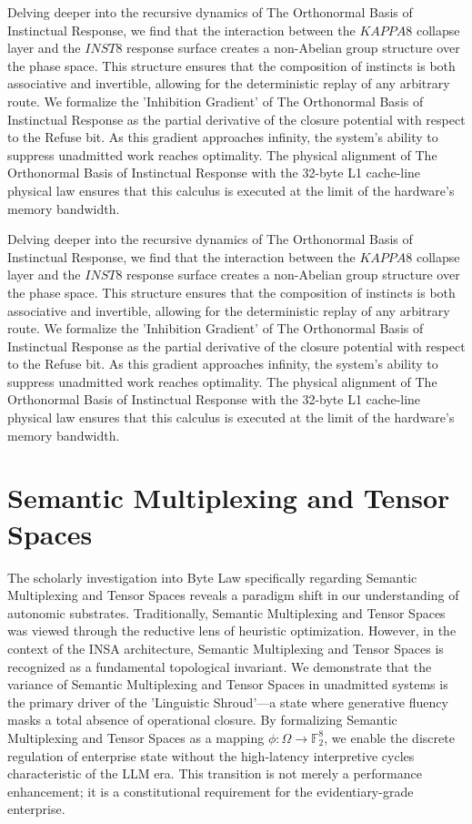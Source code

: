 \documentclass[12pt,a4paper,oneside]{book}
\begin{document}
Delving deeper into the recursive dynamics of The Orthonormal Basis of Instinctual Response, we find that the interaction between the $KAPPA8$ collapse layer and the $INST8$ response surface creates a non-Abelian group structure over the phase space. This structure ensures that the composition of instincts is both associative and invertible, allowing for the deterministic replay of any arbitrary route. We formalize the 'Inhibition Gradient' of The Orthonormal Basis of Instinctual Response as the partial derivative of the closure potential with respect to the Refuse bit. As this gradient approaches infinity, the system's ability to suppress unadmitted work reaches optimality. The physical alignment of The Orthonormal Basis of Instinctual Response with the 32-byte L1 cache-line physical law ensures that this calculus is executed at the limit of the hardware's memory bandwidth. 

Delving deeper into the recursive dynamics of The Orthonormal Basis of Instinctual Response, we find that the interaction between the $KAPPA8$ collapse layer and the $INST8$ response surface creates a non-Abelian group structure over the phase space. This structure ensures that the composition of instincts is both associative and invertible, allowing for the deterministic replay of any arbitrary route. We formalize the 'Inhibition Gradient' of The Orthonormal Basis of Instinctual Response as the partial derivative of the closure potential with respect to the Refuse bit. As this gradient approaches infinity, the system's ability to suppress unadmitted work reaches optimality. The physical alignment of The Orthonormal Basis of Instinctual Response with the 32-byte L1 cache-line physical law ensures that this calculus is executed at the limit of the hardware's memory bandwidth. 

\section{Semantic Multiplexing and Tensor Spaces}
The scholarly investigation into Byte Law specifically regarding Semantic Multiplexing and Tensor Spaces reveals a paradigm shift in our understanding of autonomic substrates. Traditionally, Semantic Multiplexing and Tensor Spaces was viewed through the reductive lens of heuristic optimization. However, in the context of the INSA architecture, Semantic Multiplexing and Tensor Spaces is recognized as a fundamental topological invariant. We demonstrate that the variance of Semantic Multiplexing and Tensor Spaces in unadmitted systems is the primary driver of the 'Linguistic Shroud'---a state where generative fluency masks a total absence of operational closure. By formalizing Semantic Multiplexing and Tensor Spaces as a mapping $\phi: \Omega \to \mathbb{F}_2^8$, we enable the discrete regulation of enterprise state without the high-latency interpretive cycles characteristic of the LLM era. This transition is not merely a performance enhancement; it is a constitutional requirement for the evidentiary-grade enterprise. 
\end{document}
